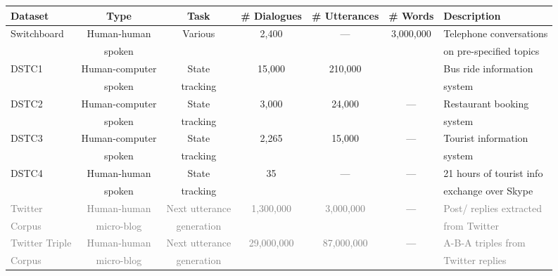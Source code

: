 \documentclass[11pt,a4paper]{article}
\begin{document}
\begin{table*}[t]
\centering
\scriptsize
\begin{tabular}{|l ||c|c|c|c|c|l|} \hline
Dataset & Type & Task & \# Dialogues & \# Utterances &  \# Words &  Description \\ \hline \hline

Switchboard \cite{godfrey1992switchboard}& Human-human& Various & 2,400 & ---& 3,000,000 & Telephone conversations \\ &spoken  & & & & & on pre-specified topics \\ \hline

DSTC1 \cite{williams2013dialog}& Human-computer&State& 15,000& 210,000& & Bus ride information \\ 
&spoken & tracking & & & & system \\ \hline

DSTC2 \cite{henderson2014second}& Human-computer& State  & 3,000 & 24,000 &  --- & Restaurant booking \\
& spoken & tracking & & & & system \\ \hline 

DSTC3 \cite{henderson2014dialog}& Human-computer & State  & 2,265 & 15,000& --- & Tourist information \\
& spoken & tracking & & & & system \\ \hline 

DSTC4\cite{dstc4} & Human-human & State  & 35 & --- & --- & 21 hours of tourist info  \\ 
& spoken & tracking & & & &exchange over Skype \\ \hline

\textcolor{gray}{Twitter} & \textcolor{gray}{Human-human} & \textcolor{gray}{Next utterance} & \textcolor{gray}{1,300,000} & \textcolor{gray}{3,000,000} &  --- &  \textcolor{gray}{Post/ replies extracted}  \\ 
\textcolor{gray}{Corpus} \cite{ritter2010unsupervised} & \textcolor{gray}{micro-blog} & \textcolor{gray}{generation}& & & & \textcolor{gray}{from Twitter} \\ \hline

\textcolor{gray}{Twitter Triple}& \textcolor{gray}{Human-human} & \textcolor{gray}{Next utterance} &\textcolor{gray}{ 29,000,000} & \textcolor{gray}{87,000,000} &  --- &  \textcolor{gray}{A-B-A triples from}  \\ 
\textcolor{gray}{Corpus} \cite{sordoni2015} & \textcolor{gray}{micro-blog} & \textcolor{gray}{generation}& & & & \textcolor{gray}{Twitter replies} \\ \hline


\end{tabular}
\end{table*}
\end{document}
